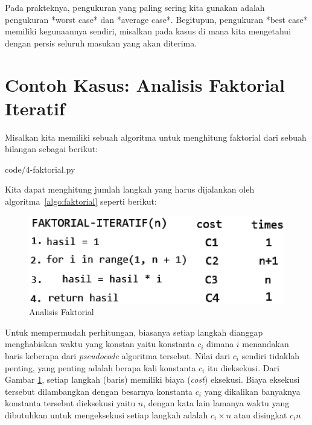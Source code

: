 Pada prakteknya, pengukuran yang paling sering kita gunakan adalah pengukuran *worst case* dan *average case*. Begitupun, pengukuran *best case* memiliki kegunaannya sendiri, misalkan pada kasus di mana kita mengetahui dengan persis seluruh masukan yang akan diterima.

\section{Contoh Kasus: Analisis Faktorial Iteratif}

Misalkan kita memiliki sebuah algoritma untuk menghitung faktorial dari sebuah bilangan sebagai berikut:


                {code/4-faktorial.py}

Kita dapat menghitung jumlah langkah yang harus dijalankan oleh algoritma~\ref{algo:faktorial} seperti berikut:

\begin{figure}%
    \includegraphics[scale=0.5]{fig/faktorialAnalysis}%
    \caption{Analisis Faktorial}%
    \label{fig:analisis-faktorial}%
\end{figure}

\FloatBarrier

Untuk mempermudah perhitungan, biasanya setiap langkah dianggap menghabiskan waktu yang konstan yaitu konstanta $c_i$ dimana $i$ menandakan baris keberapa dari \textit{pseudocode} algoritma tersebut. Nilai dari $c_i$ sendiri tidaklah penting, yang penting adalah berapa kali konstanta $c_i$ itu dieksekusi. Dari Gambar \ref{fig:analisis-faktorial}, setiap langkah (baris) memiliki biaya (\textit{cost}) eksekusi. 
Biaya eksekusi tersebut dilambangkan dengan besarnya konstanta $c_i$ yang dikalikan banyaknya konstanta tersebut dieksekusi yaitu $n$, dengan kata lain lamanya waktu yang dibutuhkan untuk mengeksekusi setiap langkah adalah $c_{i}\times{}n$ atau disingkat $c_{i}n$

